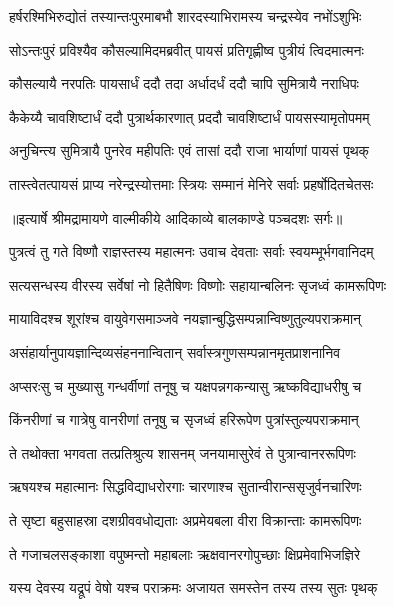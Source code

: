 \twolineshloka
{हर्षरश्मिभिरुद्योतं तस्यान्तःपुरमाबभौ}
{शारदस्याभिरामस्य चन्द्रस्येव नभोंऽशुभिः} %

\twolineshloka
{सोऽन्तःपुरं प्रविश्यैव कौसल्यामिदमब्रवीत्}
{पायसं प्रतिगृह्णीष्व पुत्रीयं त्विदमात्मनः} %

\twolineshloka
{कौसल्यायै नरपतिः पायसार्धं ददौ तदा}
{अर्धादर्धं ददौ चापि सुमित्रायै नराधिपः} %

\twolineshloka
{कैकेय्यै चावशिष्टार्धं ददौ पुत्रार्थकारणात्}
{प्रददौ चावशिष्टार्धं पायसस्यामृतोपमम्} %

\twolineshloka
{अनुचिन्त्य सुमित्रायै पुनरेव महीपतिः}
{एवं तासां ददौ राजा भार्याणां पायसं पृथक्} %

\twolineshloka
{तास्त्वेतत्पायसं प्राप्य नरेन्द्रस्योत्तमाः स्त्रियः}
{सम्मानं मेनिरे सर्वाः प्रहर्षोदितचेतसः} %


{॥इत्यार्षे श्रीमद्रामायणे वाल्मीकीये आदिकाव्ये बालकाण्डे पञ्चदशः सर्गः॥}


\twolineshloka
{पुत्रत्वं तु गते विष्णौ राज्ञस्तस्य महात्मनः}
{उवाच देवताः सर्वाः स्वयम्भूर्भगवानिदम्} %

\twolineshloka
{सत्यसन्धस्य वीरस्य सर्वेषां नो हितैषिणः}
{विष्णोः सहायान्बलिनः सृजध्वं कामरूपिणः} %

\twolineshloka
{मायाविदश्च शूरांश्च वायुवेगसमाञ्जवे}
{नयज्ञान्बुद्धिसम्पन्नान्विष्णुतुल्यपराक्रमान्} %

\twolineshloka
{असंहार्यानुपायज्ञान्दिव्यसंहननान्वितान्}
{सर्वास्त्रगुणसम्पन्नानमृतप्राशनानिव} %

\twolineshloka
{अप्सरःसु च मुख्यासु गन्धर्वीणां तनूषु च}
{यक्षपन्नगकन्यासु ऋष्कविद्याधरीषु च} %

\twolineshloka
{किंनरीणां च गात्रेषु वानरीणां तनूषु च}
{सृजध्वं हरिरूपेण पुत्रांस्तुल्यपराक्रमान्} %

\twolineshloka
{ते तथोक्ता भगवता तत्प्रतिश्रुत्य शासनम्}
{जनयामासुरेवं ते पुत्रान्वानररूपिणः} %

\twolineshloka
{ऋषयश्च महात्मानः सिद्धविद्याधरोरगाः}
{चारणाश्च सुतान्वीरान्ससृजुर्वनचारिणः} %

\twolineshloka
{ते सृष्टा बहुसाहस्रा दशग्रीववधोद्यताः}
{अप्रमेयबला वीरा विक्रान्ताः कामरूपिणः} %

\twolineshloka
{ते गजाचलसङ्काशा वपुष्मन्तो महाबलाः}
{ऋक्षवानरगोपुच्छाः क्षिप्रमेवाभिजज्ञिरे} %

\twolineshloka
{यस्य देवस्य यद्रूपं वेषो यश्च पराक्रमः}
{अजायत समस्तेन तस्य तस्य सुतः पृथक्} %

